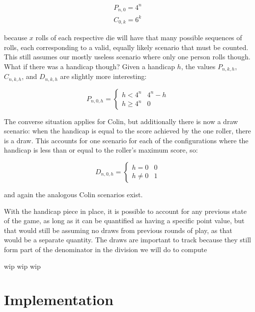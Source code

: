 \documentclass{article}
\begin{document}
\begin{align*}
    P_{n,0} = 4^n \\
    C_{0,k} = 6^k
\end{align*}

because $x$ rolls of each respective die will have that many possible sequences of rolls, each corresponding to a valid, equally likely scenario that must be counted.  This still assumes our mostly useless scenario where only one person rolls though.  What if there was a handicap though?  Given a handicap $h$, the values $P_{n,k,h}$, $C_{n,k,h}$, and $D_{n,k,h}$ are slightly more interesting:

\[
    P_{n,0,h} =
    \begin{cases}
        h < 4^n & 4^n - h \\
        h \geq 4^n & 0
    \end{cases}
\]

The converse situation applies for Colin, but additionally there is now a draw scenario: when the handicap is equal to the score achieved by the one roller, there is a draw.  This accounts for one scenario for each of the configurations where the handicap is less than or equal to the roller's maximum score, so:

\[
    D_{n,0,h} =
    \begin{cases}
        h = 0 & 0 \\
        h \neq 0 & 1
    \end{cases}
\]

and again the analogous Colin scenarios exist.

With the handicap piece in place, it is possible to account for any previous state of the game, as long as it can be quantified as having a specific point value, but that would still be assuming no draws from previous rounds of play, as that would be a separate quantity.  The draws are important to track because they still form part of the denominator in the division we will do to compute 

wip wip wip 

\section*{Implementation}

\end{document}
